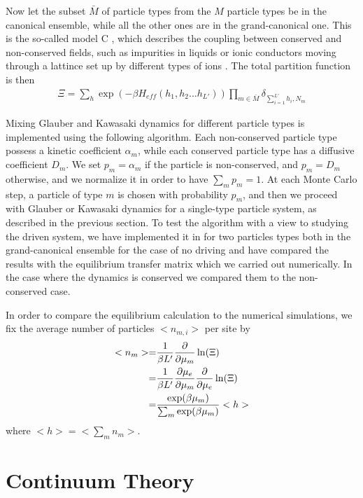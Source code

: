 Now let the subset $\bar{M}$ of particle types from the $M$ particle types be in the canonical ensemble, while all the other ones are in the grand-canonical one.  This is the so-called model C \cite{hohenberg_theory_1977}, which describes the coupling between conserved and non-conserved fields, such as impurities in liquids \cite{crisanti_dynamics_1992} or ionic conductors moving through a lattince set up by different types of ions \cite{dieterich_theoretical_1980,katz_nonequilibrium_1984}.
The total partition function is then
\begin{align}
    \Xi = \sum_h \exp \left( -\beta H_{eff}(h_1,h_2...h_{L'}) \right) \prod_{m \in \bar{M}}  \delta_{\sum_{i=1}^{L'} h_i,N_m}
\end{align}

Mixing Glauber and Kawasaki dynamics for different particle types is implemented using the following algorithm. Each non-conserved particle type possess a kinetic coefficient $\alpha_m$, while each conserved particle type has a diffusive coefficient $D_m$. We set $p_m = \alpha_m$ if the particle is non-conserved, and $p_m = D_m$ otherwise, and we normalize it in order to have $\sum_m p_m = 1$. At each Monte Carlo step, a particle of type $m$ is chosen with probability $p_m$, and then we proceed with Glauber or Kawasaki dynamics for a single-type particle system, as described in the previous section.
To test the algorithm with a view to studying the driven system, we have implemented it in for two particles types both in the grand-canonical ensemble for the case of no driving and have compared the results with the equilibrium transfer matrix which we carried out numerically. In the case where the dynamics is conserved we compared them to the non-conserved case.

In order to compare the equilibrium calculation to the numerical simulations, we fix the average number of particles $<n_{m,i}>$ per site by
\begin{align}
    < n_m > =& \frac{1}{\beta L'} \frac{\partial}{\partial \mu_m} \ln(\Xi) \nonumber \\
    =& \frac{1}{\beta L'} \frac{\partial \mu_e}{\partial \mu_m} \frac{\partial}{\partial \mu_e} \ln(\Xi) \nonumber \\
    =& \frac{\exp(\beta \mu_m)}{\sum_m \exp(\beta \mu_m)} <h>
\end{align}
where $<h> = <\sum_m n_m>$. 

    \section{Continuum Theory}    

